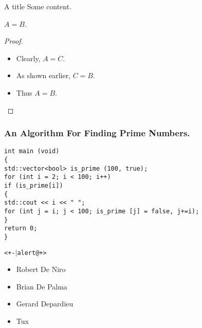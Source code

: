 \documentclass{beamer}
\begin{document}
\begin{frame}{A title}
Some content.
\end{frame}


\begin{frame}[<+->]
\begin{theorem}
$A = B$.
\end{theorem}
\begin{proof}
\begin{itemize}
\item Clearly, $A = C$.
\item As shown earlier, $C = B$.
\item<3-> Thus $A = B$.
\end{itemize}
\end{proof}
\end{frame}

\begin{frame}[fragile]
\frametitle{An Algorithm For Finding Prime Numbers.}
\begin{verbatim}
int main (void)
{
std::vector<bool> is_prime (100, true);
for (int i = 2; i < 100; i++)
if (is_prime[i])
{
std::cout << i << " ";
for (int j = i; j < 100; is_prime [j] = false, j+=i);
}
return 0;
}
\end{verbatim}
\end{frame}


\begin{frame}[<+->]{\texttt{\textless+-$\vert$alert@+\textgreater}}
\begin{itemize}
\item Robert De Niro
\item Brian De Palma
\item Gerard Depardieu
\item Tux
\end{itemize}
\end{frame}
\end{document}

